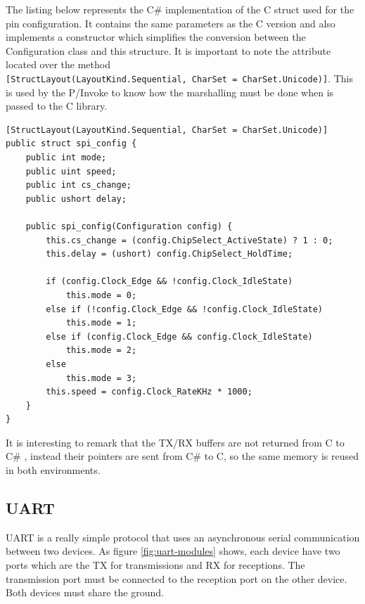 The listing below represents the C\# implementation of the C struct used for the pin configuration. It contains the same parameters as the C version and also implements a constructor which simplifies the conversion between the Configuration class and this structure. It is important to note the attribute located over the method 
\\
\verb![StructLayout(LayoutKind.Sequential, CharSet = CharSet.Unicode)]!. This is used by the P/Invoke to know how the marshalling must be done when is passed to the C library.

\begin{lstlisting}[language=CSharp, caption={SPI.cs - spi\_config struct}]
[StructLayout(LayoutKind.Sequential, CharSet = CharSet.Unicode)]
public struct spi_config {
    public int mode;
    public uint speed;
    public int cs_change;
    public ushort delay;

    public spi_config(Configuration config) {
        this.cs_change = (config.ChipSelect_ActiveState) ? 1 : 0;
        this.delay = (ushort) config.ChipSelect_HoldTime;

        if (config.Clock_Edge && !config.Clock_IdleState)
            this.mode = 0;
        else if (!config.Clock_Edge && !config.Clock_IdleState)
            this.mode = 1;
        else if (config.Clock_Edge && config.Clock_IdleState)
            this.mode = 2;
        else
            this.mode = 3;
        this.speed = config.Clock_RateKHz * 1000;
    }
}
\end{lstlisting}

It is interesting to remark that the \gls{TX}/\gls{RX} buffers are not returned from C to C\# , instead their pointers are sent from C\# to C, so the same memory is reused in both environments. 

\subsection{UART}\label{SS:IOSharp-UART}
UART is a really simple protocol that uses an asynchronous serial communication between two devices. As figure \ref{fig:uart-modules} shows, each device have two ports which are the \gls{TX} for transmissions and \gls{RX} for receptions. The transmission port must be connected to the reception port on the other device. Both devices must share the ground.

